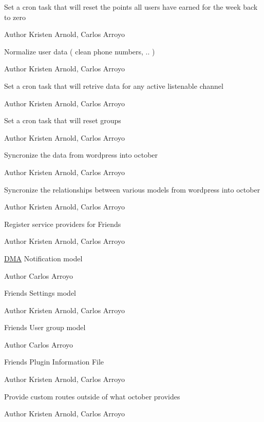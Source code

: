 Set a cron task that will reset the points all users have earned for the week back to zero

\begin{DoxyAuthor}{Author}
Kristen Arnold, Carlos Arroyo
\end{DoxyAuthor}
Normalize user data ( clean phone numbers, .. )

\begin{DoxyAuthor}{Author}
Kristen Arnold, Carlos Arroyo
\end{DoxyAuthor}
Set a cron task that will retrive data for any active listenable channel

\begin{DoxyAuthor}{Author}
Kristen Arnold, Carlos Arroyo
\end{DoxyAuthor}
Set a cron task that will reset groups

\begin{DoxyAuthor}{Author}
Kristen Arnold, Carlos Arroyo
\end{DoxyAuthor}
Syncronize the data from wordpress into october

\begin{DoxyAuthor}{Author}
Kristen Arnold, Carlos Arroyo
\end{DoxyAuthor}
Syncronize the relationships between various models from wordpress into october

\begin{DoxyAuthor}{Author}
Kristen Arnold, Carlos Arroyo
\end{DoxyAuthor}
Register service providers for Friends

\begin{DoxyAuthor}{Author}
Kristen Arnold, Carlos Arroyo
\end{DoxyAuthor}
\hyperlink{namespaceDMA}{D\+M\+A} Notification model  \begin{DoxyAuthor}{Author}
Carlos Arroyo
\end{DoxyAuthor}
Friends Settings model  \begin{DoxyAuthor}{Author}
Kristen Arnold, Carlos Arroyo
\end{DoxyAuthor}
Friends User group model  \begin{DoxyAuthor}{Author}
Carlos Arroyo
\end{DoxyAuthor}
Friends Plugin Information File

\begin{DoxyAuthor}{Author}
Kristen Arnold, Carlos Arroyo
\end{DoxyAuthor}
Provide custom routes outside of what october provides

\begin{DoxyAuthor}{Author}
Kristen Arnold, Carlos Arroyo 
\end{DoxyAuthor}
